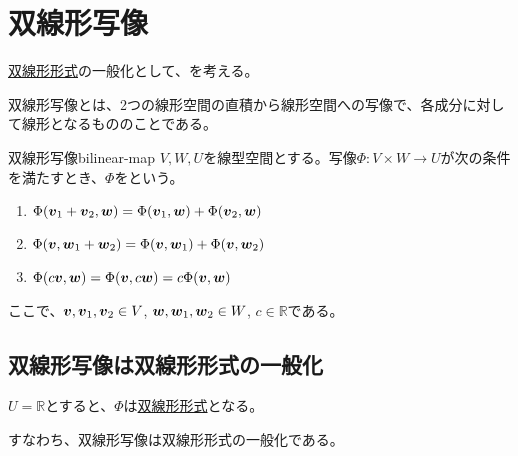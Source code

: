 \documentclass[../../../topic_linear-algebra]{subfiles}
\begin{document}
\sectionline
\section{双線形写像}

\hyperref[def:bilinear-form]{双線形形式}の一般化として、を考える。

\br

双線形写像とは、2つの線形空間の直積から線形空間への写像で、各成分に対して線形となるもののことである。

\begin{definition}{双線形写像}{bilinear-map}
  $V,W,U$を線型空間とする。写像$\Phi \colon V \times W \to U$が次の条件を満たすとき、$\Phi$をという。
  \begin{enumerate}[label=\romanlabel]
    \item $\Phi(\vb*{v}_1 + \vb*{v}_2, \vb*{w}) = \Phi(\vb*{v}_1, \vb*{w}) + \Phi(\vb*{v}_2, \vb*{w})$
    \item $\Phi(\vb*{v}, \vb*{w}_1 + \vb*{w}_2) = \Phi(\vb*{v}, \vb*{w}_1) + \Phi(\vb*{v}, \vb*{w}_2)$
    \item $\Phi(c\vb*{v}, \vb*{w}) = \Phi(\vb*{v}, c\vb*{w}) = c\Phi(\vb*{v}, \vb*{w})$
  \end{enumerate}
  ここで、$\vb*{v}, \vb*{v}_1, \vb*{v}_2 \in V$, $\vb*{w}, \vb*{w}_1, \vb*{w}_2 \in W$, $c \in \mathbb{R}$である。
\end{definition}

\subsection{双線形写像は双線形形式の一般化}

$U = \mathbb{R}$とすると、$\Phi$は\hyperref[def:bilinear-form]{双線形形式}となる。

すなわち、双線形写像は双線形形式の一般化である。
\end{document}
